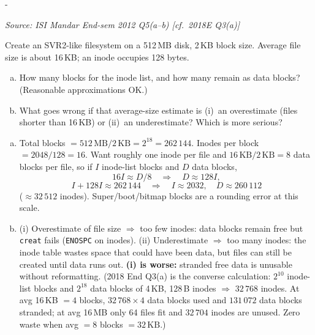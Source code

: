 \documentclass[11pt,a4paper]{article}
\makeatletter
\newcommand{\keepspace}[1]{\par\penalty-100\begingroup
  \setlength{\dimen@}{#1}\dimen@ii\pagegoal\advance\dimen@ii-\pagetotal
  \ifdim\dimen@>\dimen@ii\ifdim\dimen@ii>\z@\vfil\fi\break\fi\endgroup}
\newcounter{qn}[section]
\newenvironment{Qn}[4]{%
  \refstepcounter{qn}\keepspace{7\baselineskip}%
  \begin{tcolorbox}[qboxstyle, title={Q\thesection.\theqn\ \ [#1 \textbar\ #2]\ \ #4}]%
  {\footnotesize\color{g3}\textit{Source: #3}}\par\smallskip%
}{%
  \end{tcolorbox}%
}
\newenvironment{Sol}{%
  \begin{tcolorbox}[sboxstyle, title={Solution}]%
}{%
  \end{tcolorbox}\vspace{0.35em}%
}
\makeatother
\begin{document}
\begin{Qn}{Medium-Hard}{Lect 24}{ISI Mandar End-sem 2012 Q5(a--b) [cf.\ 2018E Q3(a)]}{How many inode-list vs data blocks?}
Create an SVR2-like filesystem on a 512\,MB disk, 2\,KB block size.
Average file size is about 16\,KB; an inode occupies 128 bytes.
\begin{enumerate}[(a)]
\item How many blocks for the inode list, and how many remain as data
      blocks? (Reasonable approximations OK.)
\item What goes wrong if that average-size estimate is (i)~an
      overestimate (files shorter than 16\,KB) or (ii)~an underestimate?
      Which is more serious?
\end{enumerate}
\end{Qn}
\begin{Sol}
\begin{enumerate}[(a)]
\item Total blocks $= 512\,\mathrm{MB}/2\,\mathrm{KB} = 2^{18} = 262\,144$.
      Inodes per block $= 2048/128 = 16$. Want roughly one inode per
      file and $16\,\mathrm{KB}/2\,\mathrm{KB}=8$ data blocks per file,
      so if $I$ inode-list blocks and $D$ data blocks,
      \[
        16I \approx D/8 \quad\Rightarrow\quad D \approx 128I,
      \]
      \[
        I + 128I \approx 262\,144 \quad\Rightarrow\quad
        I \approx 2032,\quad D \approx 260\,112
      \]
      ($\approx 32\,512$ inodes). Super/boot/bitmap blocks are a
      rounding error at this scale.
\item (i) Overestimate of file size $\Rightarrow$ too few inodes: data
      blocks remain free but \texttt{creat} fails (\texttt{ENOSPC} on
      inodes). (ii) Underestimate $\Rightarrow$ too many inodes: the
      inode table wastes space that could have been data, but files
      can still be created until data runs out. \textbf{(i) is worse:}
      stranded free data is unusable without reformatting. (2018 End
      Q3(a) is the converse calculation:  $2^{10}$ inode-list blocks
      and $2^{18}$ data blocks of 4\,KB, 128\,B inodes $\Rightarrow$
      $32\,768$ inodes. At avg 16\,KB $=4$ blocks, $32\,768\times 4$
      data blocks used and $131\,072$ data blocks stranded; at avg
      16\,MB only 64 files fit and $32\,704$ inodes are unused. Zero
      waste when avg $= 8$ blocks $=32\,\mathrm{KB}$.)
\end{enumerate}
\end{Sol}
\end{document}
